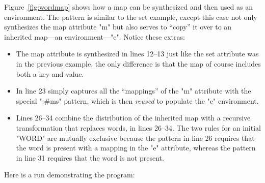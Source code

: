 \documentclass[11pt]{article} %
\begin{document}
\begin{example}\label{ex:wordmap}
  Figure~\ref{fig:wordmap} shows how a map can be synthesized and then used as an environment. The
  pattern is similar to the set example, except this case not only synthesizes the map attribute "m"
  but also serves to ``copy'' it over to an inherited map---an environment---"e". Notice these
  extras:
  \begin{itemize}

  \item The map attribute is synthesized in lines 12--13 just like the set attribute was in the
    previous example, the only difference is that the map of course includes both a key and value.

  \item In line 23 simply captures all the ``mappings'' of the "m" attribute with the special
    ":#ms" pattern, which is then \emph{reused} to populate the "e" environment.

  \item Lines 26--34 combine the distribution of the inherited map with a recursive transformation
    that replaces words, in lines 26--34. The two rules for an initial "WORD" are mutually exclusive
    because the pattern in line 26 requires that the word is present with a mapping in the "e"
    attribute, whereas the pattern in line 31 requires that the word is not present.

  \end{itemize}
  Here is a run demonstrating the program:
\end{example}
\end{document}
